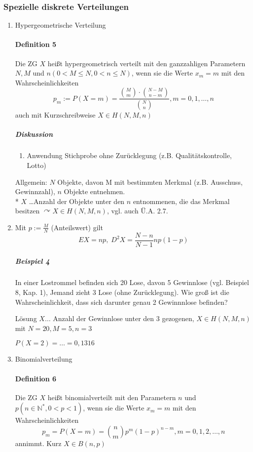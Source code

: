 \documentclass[a4paper]{scrartcl}
\begin{document}
\subsubsection{Spezielle diskrete Verteilungen}
\begin{enumerate}
\item Hypergeometrische Verteilung
\paragraph{Definition 5} Die ZG $X$ heißt hypergeometrisch verteilt mit den ganzzahligen Parametern $N,M$ und $n(0 < M \leq N, 0 < n \leq N)$, wenn sie die Werte $x_m =m$ mit den Wahrscheinlichkeiten 
\[ p_m := P(X = m) = \frac{\binom{M}{m} \cdot \binom{N-M}{n-m}}{\binom{N}{n}} , m = 0,1,\dots,n \]
auch mit Kurzschreibweise $X \in H(N,M,n)$

\subparagraph{Diskussion}
    \begin{enumerate}
    \item Anwendung Stichprobe ohne Zurücklegung (z.B. Qualitätskontrolle, Lotto)
    \end{enumerate}

Allgemein: $N$ Objekte, davon M mit bestimmten Merkmal (z.B. Ausschuss, Gewinnzahl), $n$ Objekte entnehmen.\\*
$X$ \dots Anzahl der Objekte unter den $n$ entnommenen, die das Merkmal besitzen $\curvearrowright X \in H(N,M,n)$, vgl. auch Ü.A. 2.7.
\item Mit $p:= \frac{M}{N}$ (Anteilswert) gilt
\[ EX = np, \; D^2 X = \frac{N-n}{N-1} np(1-p) \]

\subparagraph{Beispiel 4} In einer Lostrommel befinden sich 20 Lose, davon 5 Gewinnlose (vgl. Beispiel 8, Kap. 1), Jemand zieht 3 Lose (ohne Zurücklegung). Wie groß ist die Wahrscheinlichkeit, dass sich darunter genau 2 Gewinnnlose befinden?

Lösung $X \dots$ Anzahl der Gewinnlose unter den 3 gezogenen, $X \in H(N,M,n)$ mit $N=20, M=5, n=3$

$P(X=2) = \dots = 0,1316$

\item Binomialverteilung
\paragraph{Definition 6} Die ZG $X$ heißt binomialverteilt mit den Parametern $n$ und $p (n \in \mathbb{N}^*, 0 < p < 1)$, wenn sie die Werte $x_m = m$ mit den Wahrscheinlichkeiten
\[ p_m = P(X=m) = \binom{n}{m} p^m (1-p)^{n-m}, m = 0,1,2,\dots,n \] annimmt. Kurz $X \in B (n,p)$

\end{enumerate}
\end{document}
